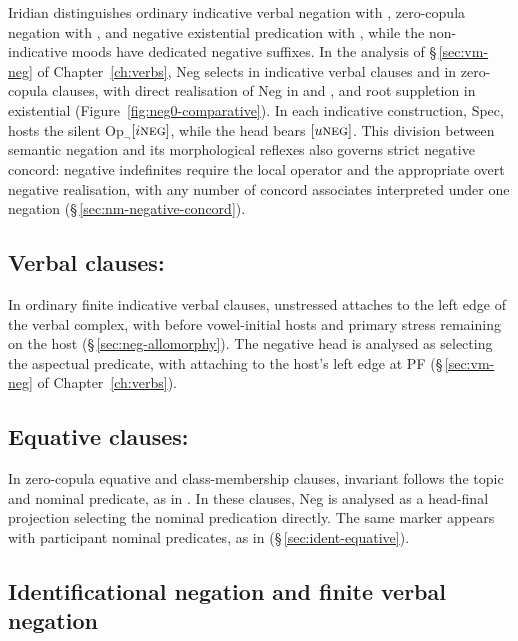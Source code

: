 Iridian distinguishes ordinary indicative verbal negation with ,
zero-copula negation with , and negative existential predication with
, while the non-indicative moods have dedicated negative suffixes.
In the analysis of §\,\ref{sec:vm-neg} of Chapter~\ref{ch:verbs},
Neg selects  in indicative verbal clauses and 
in zero-copula clauses, with direct realisation of Neg in  and
, and root suppletion in existential 
(Figure~\ref{fig:neg0-comparative}). In each indicative construction,
Spec, hosts the silent $\mathrm{Op}_{\neg}$$[i\textsc{neg}]$, while the head bears
$[u\textsc{neg}]$. This division between semantic negation and its morphological reflexes
also governs strict negative concord: negative indefinites require the local
operator and the appropriate overt negative realisation, with any number of
concord associates interpreted under one negation
(§\,\ref{sec:nm-negative-concord}).

\subsection{Verbal clauses: }

In ordinary finite indicative verbal clauses, unstressed  attaches to
the left edge of the verbal complex, with  before vowel-initial hosts
and primary stress remaining on the host (§\,\ref{sec:neg-allomorphy}). The
negative head is analysed as selecting the aspectual predicate, with
 attaching to the host's left edge at PF
(§\,\ref{sec:vm-neg} of Chapter~\ref{ch:verbs}).

\subsection{Equative clauses: }

In zero-copula equative and class-membership clauses, invariant 
follows the topic and nominal predicate, as in 
. In these clauses, Neg is analysed as a
head-final projection selecting the nominal predication directly. The same
marker appears with participant nominal
predicates, as in   (§\,\ref{sec:ident-equative}).

\subsection{Identificational negation and finite verbal negation}

